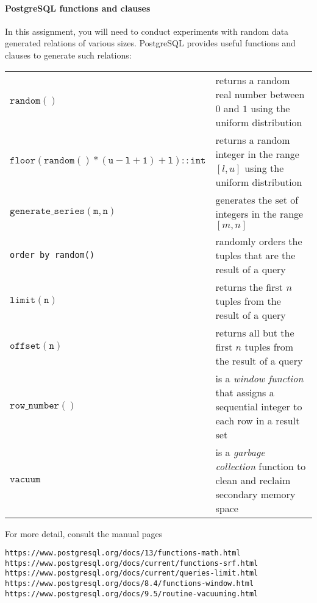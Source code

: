 \documentclass{article}
\begin{document}
\paragraph{PostgreSQL functions and clauses}

\medskip
In this assignment, you will need to conduct experiments
with random data generated relations of various sizes.   
PostgreSQL provides useful functions and clauses to generate such relations:

{\footnotesize
\begin{center}
\begin{tabular}{ll}
$\mathtt{random()}$ & returns a random real number between $0$ and $1$ using the uniform distribution\\
$\mathtt{floor(random() * (u-l+1) + l)::int}$ & returns a random integer in the range $[l,u]$ using the uniform distribution\\
$\mathtt{generate\_series(m,n)}$ & generates the set of integers in the range $[m,n]$\\
{\tt order by random()} & randomly orders the tuples that are the result of a query\\
$\mathtt{limit(n)}$ & returns the first $n$ tuples from the result of a query \\ 
$\mathtt{offset(n)}$ & returns all but the first $n$ tuples from the result of a query \\
$\mathtt{row\_number()}$& is a \emph{window function} that assigns a sequential integer to each row in a result set\\
$\mathtt{vacuum}$ & is a \emph{garbage collection} function to clean and reclaim secondary memory space
\end{tabular}
\end{center}
}
For more detail, consult the manual pages
\begin{alltt}
https://www.postgresql.org/docs/13/functions-math.html   
https://www.postgresql.org/docs/current/functions-srf.html   
https://www.postgresql.org/docs/current/queries-limit.html
https://www.postgresql.org/docs/8.4/functions-window.html
https://www.postgresql.org/docs/9.5/routine-vacuuming.html
\end{alltt}
\end{document}
